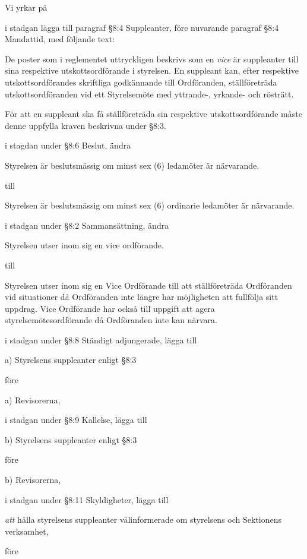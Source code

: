 \documentclass[../_main/handlingar.tex]{subfiles}
\begin{document}
Vi yrkar på
\begin{attsatser}
    \att i stadgan lägga till paragraf \S8:4 Suppleanter, före nuvarande paragraf \S8:4 Mandattid, med följande text:\par

    De poster som i reglementet uttryckligen beskrivs som en \emph{vice} är suppleanter till sina respektive utskottsordförande i styrelsen. En suppleant kan, efter respektive utskottsordförandes skriftliga godkännande till Ordföranden, ställföreträda utskottsordföranden vid ett Styrelsemöte med yttrande-, yrkande- och rösträtt.

    För att en suppleant ska få ställföreträda sin respektive utskottsordförande måste denne uppfylla kraven beskrivna under \S8:3.

    \att i stagdan under \S8:6 Beslut, ändra

    Styrelsen är beslutsmässig om minst sex (6) ledamöter är närvarande.

    till

    Styrelsen är beslutsmässig om minst sex (6) ordinarie ledamöter är närvarande.

    \att i stadgan under \S8:2 Sammansättning, ändra

    Styrelsen utser inom sig en vice ordförande.

    till

    Styrelsen utser inom sig en Vice Ordförande till att ställföreträda Ordföranden vid situationer då Ordföranden inte längre har möjligheten att fullfölja sitt uppdrag. Vice Ordförande har också till uppgift att agera styrelsemötesordförande då Ordföranden inte kan närvara.

    \att i stadgan under \S8:8 Ständigt adjungerade, lägga till

    a) Styrelsens suppleanter enligt \S8:3

    före

    a) Revisorerna,

    \att i stadgan under \S8:9 Kallelse, lägga till

    b) Styrelsens suppleanter enligt \S8:3

    före

    b) Revisorerna,

    \att i stadgan under \S8:11 Skyldigheter, lägga till

    \emph{att} hålla styrelsens suppleanter välinformerade om styrelsens och Sektionens verksamhet,

    före


\end{attsatser}
\end{document}
